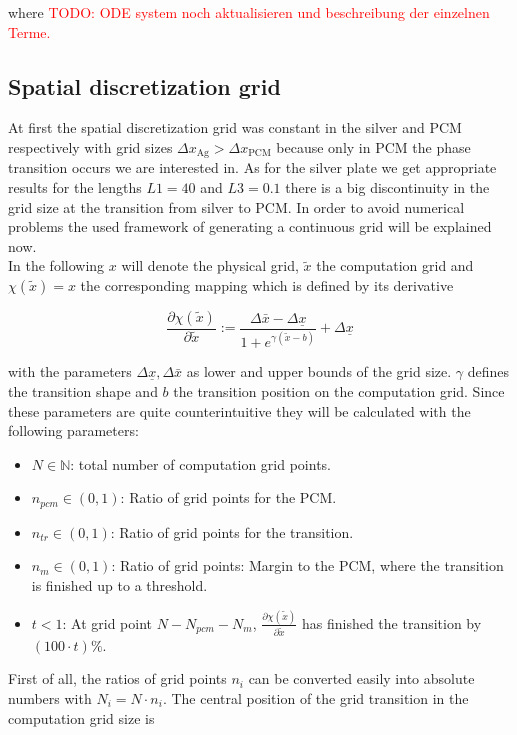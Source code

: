 \documentclass{scrartcl}[12pt, halfparskip]
\newcommand{\todo}[1]{\textcolor{red}{TODO: #1}}
\begin{document}
where \todo{ODE system noch aktualisieren und beschreibung der einzelnen Terme.}



\subsection{Spatial discretization grid}
At first the spatial discretization grid was constant in the silver and PCM respectively with grid sizes $\Delta x_{\text{Ag}} > \Delta x_{\text{PCM}}$ because only in PCM the phase transition occurs we are interested in. As for the silver plate we get appropriate results for the lengths $L1=40$ and $L3=0.1$ there is a big discontinuity in the grid size at the transition from silver to PCM. In order to avoid numerical problems the used framework of generating a continuous grid will be explained now. \\
In the following $x$ will denote the physical grid, $\tilde{x}$ the computation grid and $\chi(\tilde{x}) = x$ the corresponding mapping which is defined by its derivative

\begin{equation}
	\frac{\partial \chi(\tilde{x})}{\partial \tilde{x}} := \frac{\Delta \bar{x} - \Delta \underline{x}}{1 + e^{\gamma(\tilde{x} - b)}} + \Delta \underline{x}
\end{equation}

with the parameters $\Delta \underline{x}, \Delta \bar{x}$ as lower and upper bounds of the grid size. $\gamma$ defines the transition shape and $b$ the transition position on the computation grid. Since these parameters are quite counterintuitive they will be calculated with the following parameters:

\begin{itemize}
	\item $N \in \mathbb{N}$: total number of computation grid points.
	\item $n_{pcm} \in (0,1)$: Ratio of grid points for the PCM.
	\item $n_{tr} \in (0,1)$: Ratio of grid points for the transition.
	\item $n_{m} \in (0,1)$: Ratio of grid points: Margin to the PCM, where the transition is finished up to a threshold.
	\item $t < 1$: At grid point $N-N_{pcm}-N_m$, $\frac{\partial \chi(\tilde{x})}{\partial \tilde{x}}$ has finished the transition by $(100 \cdot t)\%$.
\end{itemize}

First of all, the ratios of grid points $n_i$ can be converted easily into absolute numbers with $N_i = N \cdot n_i$. The central position of the grid transition in the computation grid size is
\end{document}
